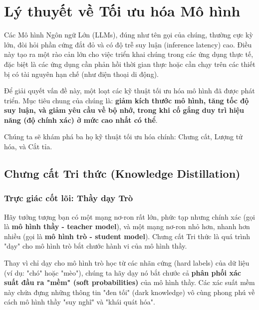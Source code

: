 
\section{Lý thuyết về Tối ưu hóa Mô hình}
\label{sec:model_optimization}

Các Mô hình Ngôn ngữ Lớn (LLMs), đúng như tên gọi của chúng, thường cực kỳ lớn, đòi hỏi phần cứng đắt đỏ và có độ trễ suy luận (inference latency) cao. Điều này tạo ra một rào cản lớn cho việc triển khai chúng trong các ứng dụng thực tế, đặc biệt là các ứng dụng cần phản hồi thời gian thực hoặc cần chạy trên các thiết bị có tài nguyên hạn chế (như điện thoại di động).

Để giải quyết vấn đề này, một loạt các kỹ thuật tối ưu hóa mô hình đã được phát triển. Mục tiêu chung của chúng là: \textbf{giảm kích thước mô hình, tăng tốc độ suy luận, và giảm yêu cầu về bộ nhớ, trong khi cố gắng duy trì hiệu năng (độ chính xác) ở mức cao nhất có thể}.

Chúng ta sẽ khám phá ba họ kỹ thuật tối ưu hóa chính: Chưng cất, Lượng tử hóa, và Cắt tỉa.

\subsection{Chưng cất Tri thức (Knowledge Distillation)}
\label{ssec:knowledge_distillation}

\subsubsection{Trực giác cốt lõi: Thầy dạy Trò}
Hãy tưởng tượng bạn có một mạng nơ-ron rất lớn, phức tạp nhưng chính xác (gọi là \textbf{mô hình thầy - teacher model}), và một mạng nơ-ron nhỏ hơn, nhanh hơn nhiều (gọi là \textbf{mô hình trò - student model}). Chưng cất Tri thức là quá trình "dạy" cho mô hình trò bắt chước hành vi của mô hình thầy.

\begin{tcolorbox}[
    title=Triết lý của Chưng cất Tri thức,
    colback=green!5!white, colframe=green!60!black, fonttitle=\bfseries
]
Thay vì chỉ dạy cho mô hình trò học từ các nhãn cứng (hard labels) của dữ liệu (ví dụ: "chó" hoặc "mèo"), chúng ta hãy dạy nó bắt chước cả \textbf{phân phối xác suất đầu ra "mềm" (soft probabilities)} của mô hình thầy. Các xác suất mềm này chứa đựng những thông tin "đen tối" (dark knowledge) vô cùng phong phú về cách mô hình thầy "suy nghĩ" và "khái quát hóa".
\end{tcolorbox}

